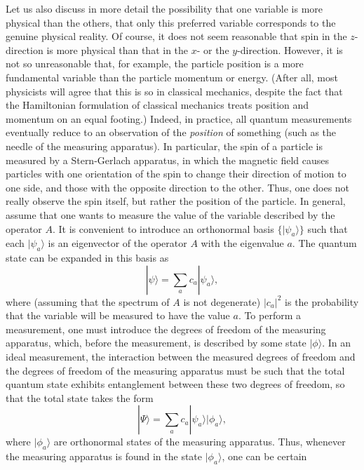 \documentclass[12pt]{article}
\begin{document}
Let us also discuss in more detail the possibility that one variable 
is more physical than the others, that only this preferred variable 
corresponds to the genuine physical reality. Of course, 
it does not seem reasonable that spin in the 
$z$-direction is more physical than that in the $x$- or the $y$-direction. 
However, it is not so unreasonable that, for example, 
the particle position is a more fundamental variable 
than the particle momentum or energy. (After all, 
most physicists will agree that this is so 
in classical mechanics, despite the fact that the Hamiltonian 
formulation of classical mechanics treats position and momentum 
on an equal footing.) Indeed, in practice, all quantum measurements 
eventually reduce to an observation of the {\em position} of 
something (such as the needle of the measuring apparatus). 
In particular, the spin of a particle is measured by a 
Stern-Gerlach apparatus, in which the magnetic field causes 
particles with one orientation of the spin to change their 
direction of motion to one side, and those with the opposite 
direction to the other. Thus, one does not really observe 
the spin itself, but rather the position of the particle.
In general, assume that one wants to measure the value of the 
variable described by the operator $A$. It is convenient 
to introduce an orthonormal basis $\{ |\psi_a\rangle \}$
such that each $|\psi_a\rangle$ is an eigenvector of the 
operator $A$ with the eigenvalue $a$.
The quantum state can be expanded in this basis as
\begin{equation}
|\psi\rangle = \sum_a c_a |\psi_a\rangle ,
\end{equation}
where (assuming that the spectrum of $A$ is not degenerate)
$|c_a|^2$ is the probability that the variable 
will be measured to have the value $a$. To perform a measurement, 
one must introduce the degrees of freedom of the measuring apparatus, 
which, before the measurement, is described by some state 
$|\phi\rangle$. In an ideal measurement, the interaction between
the measured degrees of freedom and the degrees of 
freedom of the measuring apparatus must be such that the total quantum
state exhibits entanglement between these two degrees of freedom, 
so that the total state takes the form
\begin{equation}\label{meas}
|\Psi\rangle = \sum_a c_a |\psi_a\rangle |\phi_a\rangle ,
\end{equation} 
where $|\phi_a\rangle$ are orthonormal states of the measuring apparatus.
Thus, whenever the measuring apparatus is 
found in the state $|\phi_a\rangle$, one can be certain 
\end{document}
